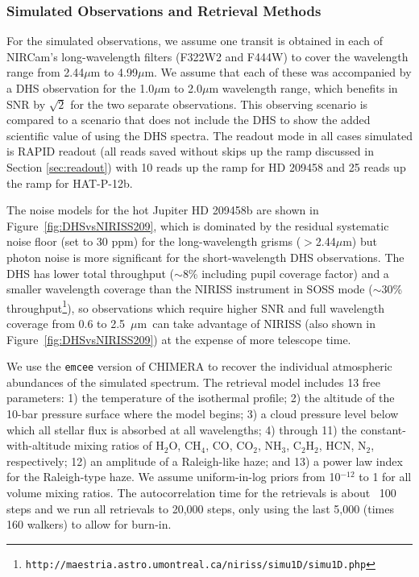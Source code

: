 \documentclass[iop]{emulateapj}
\newcommand{\SOSSrangeto}{0.6 to 2.5~$\mu$m}
\begin{document}
\subsubsection{Simulated Observations and Retrieval Methods}


For the simulated observations, we assume one transit is obtained in each of NIRCam's long-wavelength filters (F322W2 and F444W) to cover the wavelength range from 2.44$\mu$m to 4.99$\mu$m.
We assume that each of these was accompanied by a DHS observation for the 1.0$\mu$m to 2.0$\mu$m wavelength range, which benefits in SNR by $\sqrt{2}$ for the two separate observations.
This observing scenario is compared to a scenario that does not include the DHS to show the added scientific value of using the DHS spectra.
The readout mode in all cases simulated is RAPID readout (all reads saved without skips up the ramp discussed in Section \ref{sec:readout}) with 10 reads up the ramp for HD 209458 and 25 reads up the ramp for HAT-P-12b.

The noise models for the hot Jupiter HD 209458b are shown in Figure~\ref{fig:DHSvsNIRISS209}, which is dominated by the residual systematic noise floor (set to 30 ppm) for the long-wavelength grisms ($>$2.44$\mu$m) but photon noise is more significant for the short-wavelength DHS observations.
The DHS has lower total throughput ($\sim$8\% including pupil coverage factor) and a smaller wavelength coverage than the NIRISS instrument in SOSS mode ($\sim$30\% throughput\footnote{\texttt{http://maestria.astro.umontreal.ca/niriss/simu1D/simu1D.php}}), so observations which require higher SNR and full wavelength coverage from \SOSSrangeto\ can take advantage of NIRISS (also shown in Figure~\ref{fig:DHSvsNIRISS209}) at the expense of more telescope time.

We use the \texttt{emcee} version of CHIMERA \citep{greene2016jwst_trans} to recover the individual atmospheric abundances of the simulated spectrum. The retrieval model includes 13 free parameters: 1) the temperature of the isothermal profile; 2) the altitude of the 10-bar pressure surface where the model begins; 3) a cloud pressure level below which all stellar flux is absorbed at all wavelengths; 4) through 11) the constant-with-altitude mixing ratios of H$_2$O, CH$_4$, CO, CO$_2$, NH$_3$, C$_2$H$_2$, HCN, N$_2$, respectively; 12) an amplitude of a Raleigh-like haze; and 13) a power law index for the Raleigh-type haze. We assume uniform-in-log priors from 10$^{-12}$ to 1 for all volume mixing ratios. The autocorrelation time for the retrievals is about ~100 steps and we run all retrievals to 20,000 steps, only using the last 5,000 (times 160 walkers) to allow for burn-in.
\end{document}
